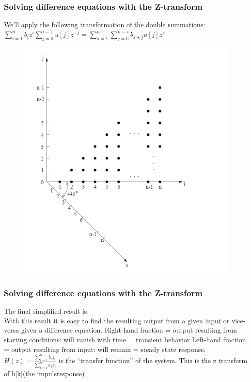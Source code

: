 \begin{frame}
	\frametitle{Solving difference equations with the Z-transform}
	We’ll apply the following transformation of the double summations:\\
	$ \sum\limits_{i=1}^{n} b_i z^i \sum\limits_{j=0}^{i-1}u[j]z^{-j} = \sum\limits_{s=1}^{n}\sum\limits_{j=0}^{n-s}b_{s+j}u[j]	z^{s}$
	\begin{figure}
	\centering
	\includegraphics[height = 0.5\textheight]{Images/discrete_time_systems_26}
	\label{fig:discrete_time_systems_26}
	\end{figure}

\end{frame}
\begin{frame}
	\frametitle{Solving difference equations with the Z-transform}
	The final simplified result is:\\
		With this result it is easy to find the resulting output from a given input or vice-versa given a difference equation.
		Right-hand fraction = output resulting from starting conditions: will vanish with time = transient behavior
		Left-hand fraction = output resulting from input: will remain = steady state response. \\
		$ H(z) = \frac{\sum\limits_{i=1}^{n} b_i z_i}{\sum\limits_{i=1}^{n} a_i z_i}$ is the “transfer function” of the system. This is the z transform of h[k](the impulsresponse)
		
\end{frame}
